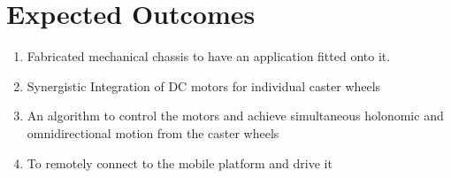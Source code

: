 \section{Expected Outcomes}

\begin{enumerate}
\item Fabricated mechanical chassis to have an application fitted onto it. \vspace*{.2cm}
\item Synergistic Integration of \ac{DC} motors for individual caster wheels\vspace*{.2cm}
\item An algorithm to control the motors and achieve simultaneous holonomic and omnidirectional motion from the caster wheels\vspace*{.2cm}
\item To remotely connect to the mobile platform and drive it\vspace*{.2cm}
	
\end{enumerate}


